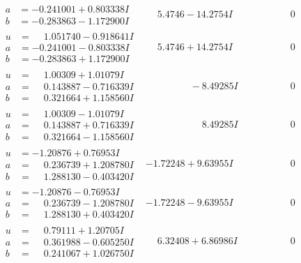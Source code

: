 \documentclass[1p]{elsarticle_modified}
\theoremstyle{definition}
\begin{document}
$$\begin{array}{c|c|c}
\begin{aligned}
a &= -0.241001 + 0.803338 I \\
b &= -0.283863 - 1.172900 I\end{aligned}
 & \phantom{-}5.4746 - 14.2754 I & \phantom{-0.000000 } 0 \\ \hline\begin{aligned}
u &= \phantom{-}1.051740 - 0.918641 I \\
a &= -0.241001 - 0.803338 I \\
b &= -0.283863 + 1.172900 I\end{aligned}
 & \phantom{-}5.4746 + 14.2754 I & \phantom{-0.000000 } 0 \\ \hline\begin{aligned}
u &= \phantom{-}1.00309 + 1.01079 I \\
a &= \phantom{-}0.143887 - 0.716339 I \\
b &= \phantom{-}0.321664 + 1.158560 I\end{aligned}
 & \phantom{-0.000000 } -8.49285 I & \phantom{-0.000000 } 0 \\ \hline\begin{aligned}
u &= \phantom{-}1.00309 - 1.01079 I \\
a &= \phantom{-}0.143887 + 0.716339 I \\
b &= \phantom{-}0.321664 - 1.158560 I\end{aligned}
 & \phantom{-0.000000 -}8.49285 I & \phantom{-0.000000 } 0 \\ \hline\begin{aligned}
u &= -1.20876 + 0.76953 I \\
a &= \phantom{-}0.236739 + 1.208780 I \\
b &= \phantom{-}1.288130 - 0.403420 I\end{aligned}
 & -1.72248 + 9.63955 I & \phantom{-0.000000 } 0 \\ \hline\begin{aligned}
u &= -1.20876 - 0.76953 I \\
a &= \phantom{-}0.236739 - 1.208780 I \\
b &= \phantom{-}1.288130 + 0.403420 I\end{aligned}
 & -1.72248 - 9.63955 I & \phantom{-0.000000 } 0 \\ \hline\begin{aligned}
u &= \phantom{-}0.79111 + 1.20705 I \\
a &= \phantom{-}0.361988 - 0.605250 I \\
b &= \phantom{-}0.241067 + 1.026750 I\end{aligned}
 & \phantom{-}6.32408 + 6.86986 I & \phantom{-0.000000 } 0\\

\end{array}$$
\end{document}
